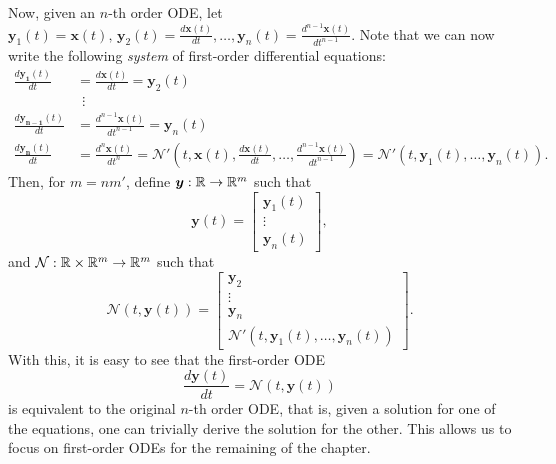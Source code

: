 Now, given an $n$-th order \gls{ODE}, let $\bm{y}_1\left( t \right) =\bm{x}\left( t \right),\,\bm{y}_2\left( t \right) = \frac{d \bm{x}\left( t \right) }{d t} ,\ldots, \bm{y}_n\left( t \right) = \frac{d^{n-1} \bm{x}\left( t \right) }{d t^{n-1}}$.
Note that we can now write the following \emph{system} of first-order differential equations:
\begin{align*}
    \frac{d \bm{y_1}\left( t \right) }{dt} &= \frac{d \bm{x}\left( t \right) }{d t} = \bm{y}_2\left( t \right) \\
    &~~\vdots \\
    \frac{d \bm{y_{n-1}}\left( t \right) }{dt} &= \frac{d^{n-1} \bm{x}\left( t \right) }{d t^{n-1}} = \bm{y}_n\left( t \right) \\
    \frac{d \bm{y_n}\left( t \right) }{dt} &= \frac{d^{n} \bm{x}\left( t \right) }{d t^{n}} = \mathcal{N}'\left( t, \bm{x}\left( t \right), \frac{d \bm{x}(t)}{d t}, \ldots,\frac{d^{n-1}\bm{x}(t)}{d t^{n-1}} \right) = \mathcal{N}'\left( t, \bm{y}_1\left( t \right), \ldots, \bm{y}_n\left( t \right) \right)
.\end{align*}
Then, for $m=n m'$, define $\bm{y}:\mathbb{R}\to \mathbb{R}^{m}$ such that \[
\bm{y}\left( t \right)  = \begin{bmatrix} 
\bm{y}_1\left( t \right) \\ \vdots \\ \bm{y}_n\left( t \right) 
\end{bmatrix} 
,\] and $\mathcal{N}:\mathbb{R}\times \mathbb{R}^{m}\to \mathbb{R}^{m}$ such that \[
    \mathcal{N}\left( t,\bm{y}\left( t \right)  \right) = \begin{bmatrix} 
    \bm{y}_2 \\ \vdots \\ \bm{y}_n \\ \mathcal{N}'\left( t, \bm{y}_1\left( t \right), \ldots, \bm{y}_n\left( t \right) \right)
    \end{bmatrix} 
.\] With this, it is easy to see that the first-order \gls{ODE}
\begin{equation}\label{eq:ode}
    \frac{d \bm{y}\left( t \right) }{d t} = \mathcal{N}\left( t, \bm{y}\left( t \right)  \right) 
\end{equation}
is equivalent to the original $n$-th order \gls{ODE}, that is, given a solution for one of the equations, one can trivially derive the solution for the other.
This allows us to focus on first-order \gls{ODE}s for the remaining of the chapter.

